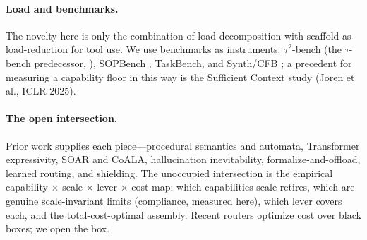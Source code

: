 \paragraph{Load and benchmarks.} The novelty here is only the combination of load decomposition with scaffold-as-load-reduction for tool use. We use benchmarks as instruments: $\tau^2$-bench \citep{ax2506_07982} (the $\tau$-bench predecessor, \citealp{ax2406_12045}), SOPBench \citep{ax2503_08669}, TaskBench, and Synth/CFB \citep{ax2501_10132}; a precedent for measuring a capability floor in this way is the Sufficient Context study (Joren et al., ICLR 2025).

\paragraph{The open intersection.} Prior work supplies each piece---procedural semantics and automata, Transformer expressivity, SOAR and CoALA, hallucination inevitability, formalize-and-offload, learned routing, and shielding. The unoccupied intersection is the empirical capability $\times$ scale $\times$ lever $\times$ cost map: which capabilities scale retires, which are genuine scale-invariant limits (compliance, measured here), which lever covers each, and the total-cost-optimal assembly. Recent routers optimize cost over black boxes; we open the box.
